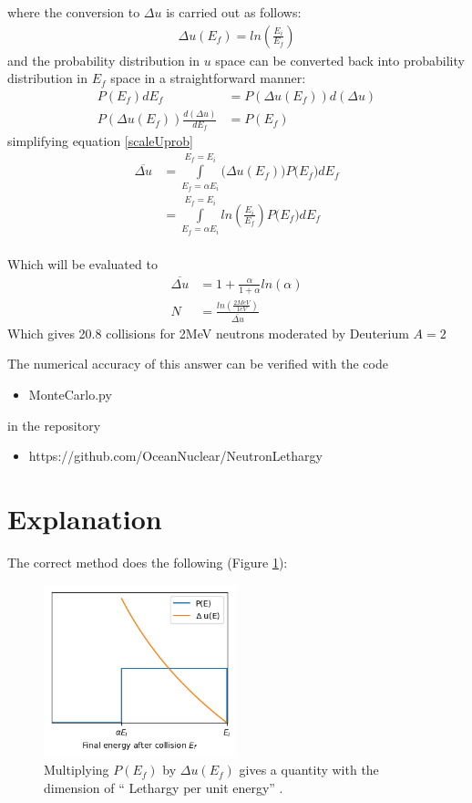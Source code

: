 \documentclass[a4paper, 12pt]{article}
\begin{document}
where the conversion to $\Delta u$ is carried out as follows:
\begin{align}
	\Delta u (E_f) = ln\left(\frac{E_i}{E_f} \right)
\end{align}
and the probability distribution in $u$ space can be converted back into probability distribution in $E_f$ space in a straightforward manner:
\begin{align}
	P(E_f) dE_f &= P(\Delta u (E_f) ) {d(\Delta u)}	\\
	P(\Delta u (E_f) ) \frac{d(\Delta u)}{dE_f} &= P(E_f)
\end{align}
simplifying equation \ref{scaleUprob}
\begin{align}
	\overline{\Delta u} &=	\int\limits_{E_f=\alpha E_i}^{E_f=E_i} \big(\Delta u (E_f) \big) P\big(E_f \big) dE_f	\\
						&=	\int\limits_{E_f=\alpha E_i}^{E_f=E_i} ln \left( \frac{E_i}{E_f} \right) P\big(E_f \big) dE_f \\
\end{align}

Which will be evaluated to
\begin{align}
	\overline{\Delta u} &=	1+\frac{\alpha}{1+\alpha} ln(\alpha)	\\
	N &= \frac{ ln \left( \frac{2 MeV}{1eV} \right)} { \overline{\Delta u} }
\end{align}
Which gives 20.8 collisions for 2MeV neutrons moderated by Deuterium $A=2$

The numerical accuracy of this answer can be verified with the code
\begin{itemize}
	\item MonteCarlo.py
\end{itemize}

in the repository 
\begin{itemize}
	\item https://github.com/OceanNuclear/NeutronLethargy
\end{itemize}

\section{Explanation}
	The correct method does the following (Figure \ref{Fig1}):
	
	\begin{figure}[H]
	\centering
	\includegraphics[height=5cm]{Fig1.png}
	\caption{Multiplying $P(E_f)$ by $\Delta u(E_f)$ gives a quantity with the dimension of `` Lethargy per unit energy'' .
	}\label{Fig1}
	\end{figure}
	
\end{document}
